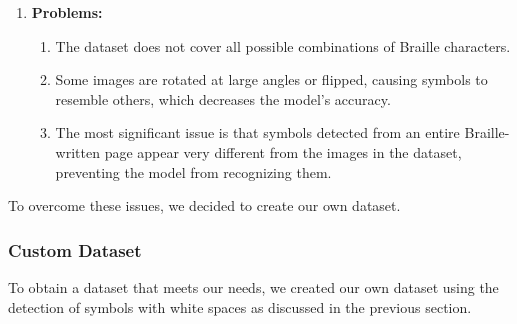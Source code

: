 \begin{enumerate}
    \item \textbf{Problems:}
    \begin{enumerate}
        \item The dataset does not cover all possible combinations of Braille characters.
        \item Some images are rotated at large angles or flipped, causing symbols to resemble others, which decreases the model's accuracy.
        \item The most significant issue is that symbols detected from an entire Braille-written page appear very different from the images in the dataset, preventing the model from recognizing them.
    \end{enumerate}

\end{enumerate}

To overcome these issues, we decided to create our own dataset.

\subsubsection{Custom Dataset}
To obtain a dataset that meets our needs, we created our own dataset using the detection of symbols with white spaces as discussed in the previous section.

